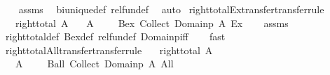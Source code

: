 \begin{isabellebody}
%
\isadelimproof
\ \ %
\endisadelimproof
%
\isatagproof
{}\isamarkupfalse%
\ assms\ \isamarkupfalse%
\ bi{\isacharunderscore}{\kern0pt}unique{\isacharunderscore}{\kern0pt}def\ rel{\isacharunderscore}{\kern0pt}fun{\isacharunderscore}{\kern0pt}def\ \isamarkupfalse%
\ auto%
\endisatagproof
{\isafoldproof}%
%
\isadelimproof
\isanewline
%
\endisadelimproof
\isanewline
{}\isamarkupfalse%
\ right{\isacharunderscore}{\kern0pt}total{\isacharunderscore}{\kern0pt}Ex{\isacharunderscore}{\kern0pt}transfer{\isacharbrackleft}{\kern0pt}transfer{\isacharunderscore}{\kern0pt}rule{\isacharbrackright}{\kern0pt}{\isacharcolon}{\kern0pt}\isanewline
\ \ \ {\isachardoublequoteopen}right{\isacharunderscore}{\kern0pt}total\ A{\isachardoublequoteclose}\isanewline
\ \ \ {\isachardoublequoteopen}{\isacharparenleft}{\kern0pt}{\isacharparenleft}{\kern0pt}A\ {\isacharequal}{\kern0pt}{\isacharequal}{\kern0pt}{\isacharequal}{\kern0pt}{\isachargreater}{\kern0pt}\ {\isacharparenleft}{\kern0pt}{\isacharequal}{\kern0pt}{\isacharparenright}{\kern0pt}{\isacharparenright}{\kern0pt}\ {\isacharequal}{\kern0pt}{\isacharequal}{\kern0pt}{\isacharequal}{\kern0pt}{\isachargreater}{\kern0pt}\ {\isacharparenleft}{\kern0pt}{\isacharequal}{\kern0pt}{\isacharparenright}{\kern0pt}{\isacharparenright}{\kern0pt}\ {\isacharparenleft}{\kern0pt}Bex\ {\isacharparenleft}{\kern0pt}Collect\ {\isacharparenleft}{\kern0pt}Domainp\ A{\isacharparenright}{\kern0pt}{\isacharparenright}{\kern0pt}{\isacharparenright}{\kern0pt}\ Ex{\isachardoublequoteclose}\isanewline
%
\isadelimproof
\ \ %
\endisadelimproof
%
\isatagproof
{}\isamarkupfalse%
\ assms\ \isamarkupfalse%
\ right{\isacharunderscore}{\kern0pt}total{\isacharunderscore}{\kern0pt}def\ Bex{\isacharunderscore}{\kern0pt}def\ rel{\isacharunderscore}{\kern0pt}fun{\isacharunderscore}{\kern0pt}def\ Domainp{\isacharunderscore}{\kern0pt}iff\isanewline
\ \ \isamarkupfalse%
\ fast%
\endisatagproof
{\isafoldproof}%
%
\isadelimproof
\isanewline
%
\endisadelimproof
\isanewline
{}\isamarkupfalse%
\ right{\isacharunderscore}{\kern0pt}total{\isacharunderscore}{\kern0pt}All{\isacharunderscore}{\kern0pt}transfer{\isacharbrackleft}{\kern0pt}transfer{\isacharunderscore}{\kern0pt}rule{\isacharbrackright}{\kern0pt}{\isacharcolon}{\kern0pt}\isanewline
\ \ \ {\isachardoublequoteopen}right{\isacharunderscore}{\kern0pt}total\ A{\isachardoublequoteclose}\isanewline
\ \ \ {\isachardoublequoteopen}{\isacharparenleft}{\kern0pt}{\isacharparenleft}{\kern0pt}A\ {\isacharequal}{\kern0pt}{\isacharequal}{\kern0pt}{\isacharequal}{\kern0pt}{\isachargreater}{\kern0pt}\ {\isacharparenleft}{\kern0pt}{\isacharequal}{\kern0pt}{\isacharparenright}{\kern0pt}{\isacharparenright}{\kern0pt}\ {\isacharequal}{\kern0pt}{\isacharequal}{\kern0pt}{\isacharequal}{\kern0pt}{\isachargreater}{\kern0pt}\ {\isacharparenleft}{\kern0pt}{\isacharequal}{\kern0pt}{\isacharparenright}{\kern0pt}{\isacharparenright}{\kern0pt}\ {\isacharparenleft}{\kern0pt}Ball\ {\isacharparenleft}{\kern0pt}Collect\ {\isacharparenleft}{\kern0pt}Domainp\ A{\isacharparenright}{\kern0pt}{\isacharparenright}{\kern0pt}{\isacharparenright}{\kern0pt}\ All{\isachardoublequoteclose}\isanewline

\end{isabellebody}
